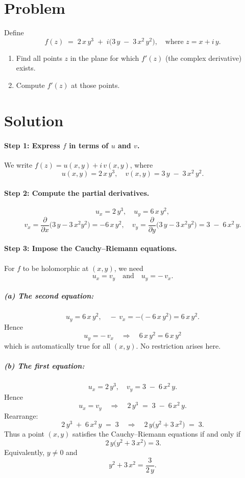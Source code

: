 \documentclass[12pt]{article}
\theoremstyle{definition} %
\theoremstyle{plain} %
\begin{document}
\section*{Problem}
Define 
\[
f(z) \;=\; 2\,x\,y^{3}\;+\; i\bigl(3\,y \;-\; 3\,x^{2}\,y^{2}\bigr),
\quad
\text{where }z = x + i\,y.
\]
\begin{enumerate}
\item Find all points $z$ in the plane for which $f'(z)$ (the complex derivative) exists.
\item Compute $f'(z)$ at those points.
\end{enumerate}

\section*{Solution}

\paragraph{Step 1: Express $f$ in terms of $u$ and $v$.}
We write $f(z) = u(x,y) + i\,v(x,y)$, where
\[
u(x,y) = 2\,x\,y^{3},
\quad
v(x,y) = 3\,y \;-\; 3\,x^{2}\,y^{2}.
\]

\paragraph{Step 2: Compute the partial derivatives.}
\[
u_{x} = 2\,y^{3},
\quad
u_{y} = 6\,x\,y^{2},
\]
\[
v_{x} = \frac{\partial}{\partial x}\bigl(3\,y - 3\,x^{2}y^{2}\bigr) 
= -6\,x\,y^{2},
\quad
v_{y} = \frac{\partial}{\partial y}\bigl(3\,y - 3\,x^{2}y^{2}\bigr) 
= 3 \;-\;6\,x^{2}\,y.
\]

\paragraph{Step 3: Impose the Cauchy--Riemann equations.}
For $f$ to be holomorphic at $(x,y)$, we need
\[
u_{x} = v_{y}
\quad\text{and}\quad
u_{y} = -\,v_{x}.
\]

\subparagraph{(a) The second equation:}
\[
u_{y} = 6\,x\,y^{2}, 
\quad
-\,v_{x} = -\bigl(-6\,x\,y^{2}\bigr) = 6\,x\,y^{2}.
\]
Hence 
\[
u_{y} = -\,v_{x}
\quad\Longrightarrow\quad
6\,x\,y^{2} = 6\,x\,y^{2}
\]
which is automatically true for all $(x,y)$.  No restriction arises here.

\subparagraph{(b) The first equation:}
\[
u_{x} = 2\,y^{3},
\quad
v_{y} = 3 \;-\; 6\,x^{2}\,y.
\]
Hence
\[
u_{x} = v_{y}
\quad\Longrightarrow\quad
2\,y^{3} \;=\; 3 \;-\;6\,x^{2}\,y.
\]
Rearrange:
\[
2\,y^{3} \;+\; 6\,x^{2}\,y \;=\; 3
\quad\Longrightarrow\quad
2\,y\bigl(y^{2} + 3\,x^{2}\bigr) \;=\; 3.
\]
Thus a point $(x,y)$ satisfies the Cauchy--Riemann equations if and only if
\[
\boxed{\,2\,y\bigl(y^{2} + 3\,x^{2}\bigr) = 3.}
\]
Equivalently, $y \neq 0$ and
\[
y^{2} + 3\,x^{2} = \frac{3}{2\,y}.
\]
\end{document}
